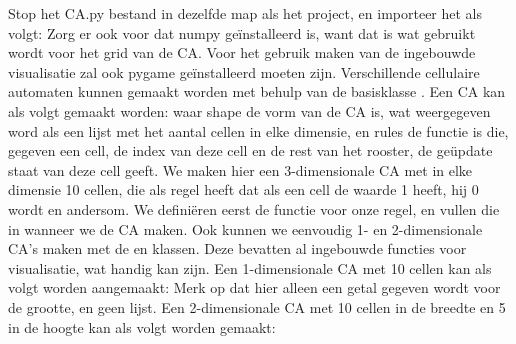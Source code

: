 \markdownRendererDocumentBegin
{}\markdownRendererInterblockSeparator
{}Stop het CA.py bestand in dezelfde map als het project, en importeer het als volgt:\markdownRendererInterblockSeparator
{}\markdownRendererInterblockSeparator
{}Zorg er ook voor dat numpy geïnstalleerd is, want dat is wat gebruikt wordt voor het grid van de CA. Voor het gebruik maken van de ingebouwde visualisatie zal ook pygame geïnstalleerd moeten zijn.\markdownRendererInterblockSeparator
{}\markdownRendererInterblockSeparator
{}Verschillende cellulaire automaten kunnen gemaakt worden met behulp van de basisklasse . Een CA kan als volgt gemaakt worden:\markdownRendererInterblockSeparator
{}\markdownRendererInterblockSeparator
{}waar shape de vorm van de CA is, wat weergegeven word als een lijst met het aantal cellen in elke dimensie, en rules de functie is die, gegeven een cell, de index van deze cell en de rest van het rooster, de geüpdate staat van deze cell geeft.\markdownRendererInterblockSeparator
{}\markdownRendererInterblockSeparator
{}We maken hier een 3-dimensionale CA met in elke dimensie 10 cellen, die als regel heeft dat als een cell de waarde 1 heeft, hij 0 wordt en andersom.\markdownRendererInterblockSeparator
{}We definiëren eerst de functie voor onze regel, en vullen die in wanneer we de CA maken.\markdownRendererInterblockSeparator
{}\markdownRendererInterblockSeparator
{}\markdownRendererInterblockSeparator
{}Ook kunnen we eenvoudig 1- en 2-dimensionale CA's maken met de  en  klassen. Deze bevatten al ingebouwde functies voor visualisatie, wat handig kan zijn.\markdownRendererInterblockSeparator
{}Een 1-dimensionale CA met 10 cellen kan als volgt worden aangemaakt:\markdownRendererInterblockSeparator
{}\markdownRendererInterblockSeparator
{}Merk op dat hier alleen een getal gegeven wordt voor de grootte, en geen lijst.\markdownRendererInterblockSeparator
{}Een 2-dimensionale CA met 10 cellen in de breedte en 5 in de hoogte kan als volgt worden gemaakt:\markdownRendererInterblockSeparator
